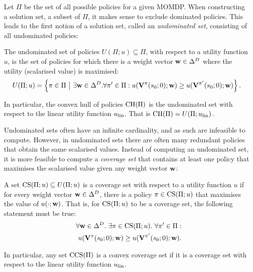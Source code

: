 Let $\Pi$ be the set of all possible policies for a given MOMDP. When constructing a solution set, a subset of $\Pi$, it makes sense to exclude dominated policies. This leads to the first notion of a solution set, called an \textit{undominated set}, consisting of all undominated policies:
\begin{defn}
    \label{def:2:undominated_set}
    \label{def:2:convex_hull}
    The \textnormal{undominated set} of policies $U(\Pi;u)\subseteq\Pi$, with respect to a utility function $u$,  is the set of policies for which there is a weight vector $\mathbf{w}\in\Delta^D$ where the utility (scalarised value) is maximised: 
    \begin{align}
        U(\Pi;u) = \left\{\pi\in\Pi\ \big|\ \exists \mathbf{w}\in\Delta^D. \forall \pi'\in\Pi: u(\mathbf{V}^{\pi}(s_0;0);\mathbf{w}) \geq u(\mathbf{V}^{\pi'}(s_0;0);\mathbf{w}) \right\}. \label{eq:2:undominated_set_def}
    \end{align}

    In particular, the \textnormal{convex hull} of policies $\textnormal{CH}(\Pi)$ is the undominated set with respect to the linear utility function $u_{{\textnormal{lin}}}$. That is $\textnormal{CH}(\Pi)=U(\Pi;u_{{\textnormal{lin}}})$.
\end{defn}    

Undominated sets often have an infinite cardinality, and as such are infeasible to compute. However, in undominated sets there are often many redundant policies that obtain the same scalarised values. Instead of computing an undominated set, it is more feasible to compute a \textit{coverage set} that contains at least one policy that maximises the scalarised value given any weight vector $\mathbf{w}$:
\begin{defn}
    \label{def:2:coverage_set}
    \label{def:2:convex_coverage_set}
    A set $\textnormal{CS}(\Pi;u)\subseteq U(\Pi;u)$ is a \textnormal{coverage set} with respect to a utility function $u$ if for every weight vector $\mathbf{w}\in\Delta^D$, there is a policy $\pi\in \textnormal{CS}(\Pi;u)$ that maximises the value of $u(\cdot;\mathbf{w})$. That is, for $\textnormal{CS}(\Pi;u)$ to be a coverage set, the following statement must be true:
    \begin{align}
        \forall \mathbf{w}\in\Delta^D.\ \exists \pi\in \textnormal{CS}(\Pi;u).\ \forall \pi'\in\Pi: \nonumber \\ 
        \quad u(\mathbf{V}^{\pi}(s_0;0);\mathbf{w}) \geq u(\mathbf{V}^{\pi'}(s_0;0);\mathbf{w}). \label{eq:2:coverage_set}
    \end{align}

    In particular, any set $\textnormal{CCS}(\Pi)$ is a \textnormal{convex coverage set} if it is a coverage set with respect to the linear utility function $u_{{\textnormal{lin}}}$. 
\end{defn}

